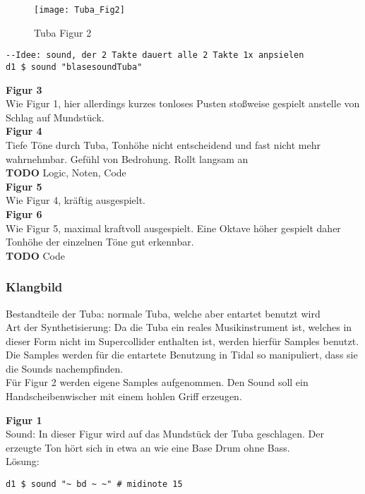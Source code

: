 \documentclass[
10pt, %
a4paper, %
oneside, %
headinclude,footinclude, %
BCOR5mm, %
]{scrartcl}
\begin{document}
\begin{figure}[h]
	\centering 
	\texttt{[image: Tuba\_Fig2]} 
	\caption{Tuba Figur 2}
\end{figure}

\begin{lstlisting}
--Idee: sound, der 2 Takte dauert alle 2 Takte 1x anpsielen
d1 $ sound "blasesoundTuba"
\end{lstlisting}

\noindent\textbf{Figur 3}\\
Wie Figur 1, hier allerdings kurzes tonloses Pusten stoßweise gespielt anstelle von Schlag auf Mundstück.\\

\noindent\textbf{Figur 4}\\
Tiefe Töne durch Tuba, Tonhöhe nicht entscheidend und fast nicht mehr wahrnehmbar. Gefühl von Bedrohung. Rollt langsam an\\
{\color{red}\textbf{TODO}} Logic, Noten, Code\\

\noindent\textbf{Figur 5}\\
Wie Figur 4, kräftig ausgespielt.\\

\noindent\textbf{Figur 6}\\
Wie Figur 5, maximal kraftvoll ausgespielt. Eine Oktave höher gespielt daher Tonhöhe der einzelnen Töne gut erkennbar.\\
{\color{red}\textbf{TODO}} Code

\subsubsection{Klangbild}
Bestandteile der Tuba: normale Tuba, welche aber entartet benutzt wird\\
Art der Synthetisierung: Da die Tuba ein reales Musikinstrument ist, welches in dieser Form nicht im Supercollider enthalten ist,
werden hierfür Samples benutzt. Die Samples werden für die entartete Benutzung in Tidal so manipuliert, dass sie die Sounds
nachempfinden.\\
Für Figur 2 werden eigene Samples aufgenommen. Den Sound soll ein Handscheibenwischer mit einem hohlen Griff erzeugen.

\noindent\textbf{Figur 1}\\
 Sound: In dieser Figur wird auf das Mundstück der Tuba geschlagen. Der erzeugte Ton hört sich in etwa an wie eine Base Drum ohne Bass.\\
Lösung:\\
\begin{lstlisting}
d1 $ sound "~ bd ~ ~" # midinote 15
\end{lstlisting}
\end{document}

